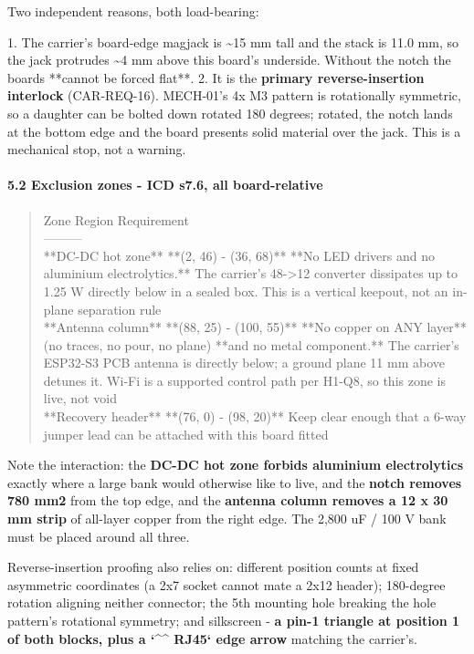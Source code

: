 \documentclass[11pt,a4paper]{article}
\begin{document}
Two independent reasons, both load-bearing:

1. The carrier's board-edge magjack is \textasciitilde{}15 mm tall and the stack is 11.0 mm, so the jack protrudes \textasciitilde{}4 mm above this board's underside. Without the notch the boards {*}{*}cannot be forced flat{*}{*}. 2. It is the \textbf{primary reverse-insertion interlock} (CAR-REQ-16). MECH-01's 4x M3 pattern is rotationally symmetric, so a daughter can be bolted down rotated 180 degrees; rotated, the notch lands at the bottom edge and the board presents solid material over the jack. This is a mechanical stop, not a warning.

\paragraph*{5.2 Exclusion zones - ICD s7.6, all board-relative}
\begin{quote}\small\ttfamily\raggedright
\textbar{} Zone \textbar{} Region \textbar{} Requirement \textbar{}\\
\textbar{}---\textbar{}---\textbar{}---\textbar{}\\
\textbar{} {*}{*}DC-DC hot zone{*}{*} \textbar{} {*}{*}(2, 46) - (36, 68){*}{*} \textbar{} {*}{*}No LED drivers and no aluminium electrolytics.{*}{*} The carrier's 48-\textgreater{}12 converter dissipates up to 1.25 W directly below in a sealed box. This is a vertical keepout, not an in-plane separation rule \textbar{}\\
\textbar{} {*}{*}Antenna column{*}{*} \textbar{} {*}{*}(88, 25) - (100, 55){*}{*} \textbar{} {*}{*}No copper on ANY layer{*}{*} (no traces, no pour, no plane) {*}{*}and no metal component.{*}{*} The carrier's ESP32-S3 PCB antenna is directly below; a ground plane 11 mm above detunes it. Wi-Fi is a supported control path per H1-Q8, so this zone is live, not void \textbar{}\\
\textbar{} {*}{*}Recovery header{*}{*} \textbar{} {*}{*}(76, 0) - (98, 20){*}{*} \textbar{} Keep clear enough that a 6-way jumper lead can be attached with this board fitted \textbar{}
\end{quote}
Note the interaction: the \textbf{DC-DC hot zone forbids aluminium electrolytics} exactly where a large bank would otherwise like to live, and the \textbf{notch removes 780 mm2} from the top edge, and the \textbf{antenna column removes a 12 x 30 mm strip} of all-layer copper from the right edge. The 2,800 uF / 100 V bank must be placed around all three.

Reverse-insertion proofing also relies on: different position counts at fixed asymmetric coordinates (a 2x7 socket cannot mate a 2x12 header); 180-degree rotation aligning neither connector; the 5th mounting hole breaking the hole pattern's rotational symmetry; and silkscreen - \textbf{a pin-1 triangle at position 1 of both blocks, plus a `\textasciicircum{}\textasciicircum{} RJ45` edge arrow} matching the carrier's.
\end{document}
